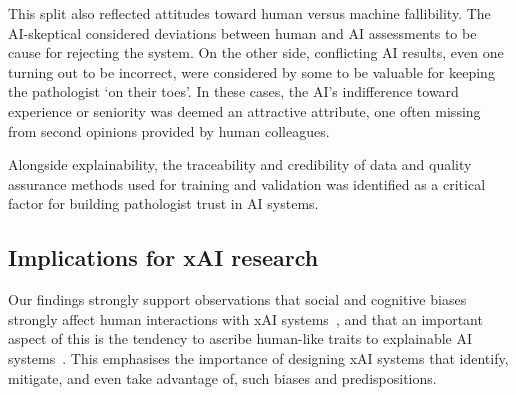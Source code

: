 
This split also reflected attitudes toward human versus machine fallibility. The AI-skeptical considered deviations between human and AI assessments to be cause for rejecting the system. On the other side, conflicting AI results, even one turning out to be incorrect, were considered by some to be valuable for keeping the pathologist `on their toes'. In these cases, the AI's indifference toward experience or seniority was deemed an attractive attribute, one often missing from second opinions provided by human colleagues.


Alongside explainability, the traceability and credibility of data and quality assurance methods used for training and validation was identified as a critical factor for building pathologist trust in AI systems.

\subsection{Implications for xAI research}



Our findings strongly support observations that social and cognitive biases strongly affect human interactions with xAI systems~\cite{miller2019explanation, jussupow2021augmenting}, and that an important aspect of this is the tendency to ascribe human-like traits to explainable AI systems~\citet{de2017people, miller2019explanation}. This emphasises the importance of designing xAI systems that identify, mitigate, and even take advantage of, such biases and predispositions.

